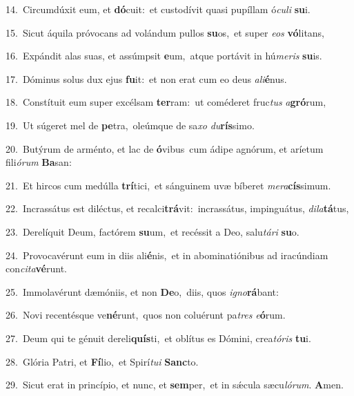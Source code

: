 {\numbfont\textcolor{\numbcolor}{14.}}~Circumdúxit eum, et \textbf{dó}\-cuit:~\star et custodívit quasi pupíllam ó\-\textit{cu}\-\textit{li} \textbf{su}\-i.\par
{\numbfont\textcolor{\numbcolor}{15.}}~Sicut áquila próvocans ad volándum pullos \textbf{su}\-os,~\star et super \textit{e}\-\textit{os} \textbf{vó}\-litans,\par
{\numbfont\textcolor{\numbcolor}{16.}}~Expándit alas suas, et assúmpsit \textbf{e}\-um,~\star atque portávit in hú\-\textit{me}\-\textit{ris} \textbf{su}\-is.\par
{\numbfont\textcolor{\numbcolor}{17.}}~Dóminus solus dux ejus \textbf{fu}\-it:~\star et non erat cum eo deus \textit{a}\-\textit{li}\textbf{é}nus.\par
{\numbfont\textcolor{\numbcolor}{18.}}~Constítuit eum super excélsam \textbf{ter}\-ram:~\star ut coméderet fruc\textit{tus} \textit{a}\-\textbf{gró}rum,\par
{\numbfont\textcolor{\numbcolor}{19.}}~Ut súgeret mel de \textbf{pe}\-tra,~\star oleúmque de sa\textit{xo} \textit{du}\-\textbf{rís}simo.\par
{\numbfont\textcolor{\numbcolor}{20.}}~Butýrum de arménto, et lac de \textbf{ó}\-vibus~\star cum ádipe agnórum, et aríetum fili\-\textit{ó}\-\textit{rum} \textbf{Ba}\-san:\par
{\numbfont\textcolor{\numbcolor}{21.}}~Et hircos cum medúlla \textbf{trí}\-tici,~\star et sánguinem uvæ bíberet \textit{me}\-\textit{ra}\textbf{cís}simum.\par
{\numbfont\textcolor{\numbcolor}{22.}}~Incrassátus est diléctus, et recalci\-\textbf{trá}\-vit:~\star incrassátus, impinguátus, \textit{di}\-\textit{la}\textbf{tá}tus,\par
{\numbfont\textcolor{\numbcolor}{23.}}~Derelíquit Deum, factórem \textbf{su}\-um,~\star et recéssit a Deo, salu\-\textit{tá}\-\textit{ri} \textbf{su}\-o.\par
{\numbfont\textcolor{\numbcolor}{24.}}~Provocavérunt eum in diis ali\-\textbf{é}\-nis,~\star et in abominatiónibus ad iracúndiam con\-\textit{ci}\-\textit{ta}\textbf{vé}runt.\par
{\numbfont\textcolor{\numbcolor}{25.}}~Immolavérunt dæmóniis, et non \textbf{De}\-o,~\star diis, quos \textit{i}\-\textit{gno}\textbf{rá}bant:\par
{\numbfont\textcolor{\numbcolor}{26.}}~Novi recentésque ve\-\textbf{né}\-runt,~\star quos non coluérunt pa\textit{tres} \textit{e}\-\textbf{ó}rum.\par
{\numbfont\textcolor{\numbcolor}{27.}}~Deum qui te génuit dereli\-\textbf{quís}\-ti,~\star et oblítus es Dómini, crea\-\textit{tó}\-\textit{ris} \textbf{tu}\-i.\par
{\numbfont\textcolor{\numbcolor}{28.}}~Glória Patri, et \textbf{Fí}\-lio,~\star et Spirí\-\textit{tu}\-\textit{i} \textbf{Sanc}\-to.\par
{\numbfont\textcolor{\numbcolor}{29.}}~Sicut erat in princípio, et nunc, et \textbf{sem}\-per,~\star et in sǽcula sæcu\-\textit{ló}\-\textit{rum}. \textbf{A}\-men.\par
